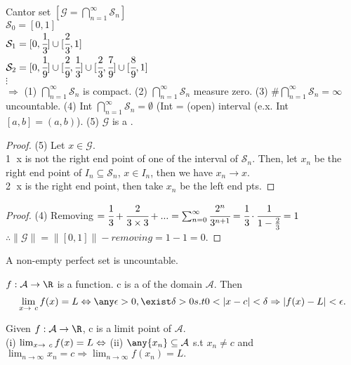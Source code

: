 \begin{definition}
\label{Cantor set}
    Cantor set $[ \mathcal{G} = \bigcap\limits_{n=1}^\infty \mathcal{S}_n]$ \\
    $\mathcal{S}_0 = [0,1]$\\
    $\mathcal{S}_1 = [0,\cfrac{1}{3}]\cup [\cfrac{2}{3},1]$\\
    $\mathcal{S}_2 = [0, \cfrac{1}{9}] \cup [\cfrac{2}{9}, \cfrac{1}{3}]\cup [\cfrac{2}{3}, \cfrac{7}{9}]\cup[\cfrac{8}{9}, 1]$\\
    $\vdots$ \\
    $\Rightarrow$ (1)  $\bigcap\limits_{n=1}^\infty \mathcal{S}_n$ is compact. (2) $\bigcap\limits_{n=1}^\infty \mathcal{S}_n$ measure zero. (3) $\#\bigcap\limits_{n=1}^\infty \mathcal{S}_n = \infty$ uncountable. (4) Int $\bigcap\limits_{n=1}^\infty \mathcal{S}_n = \emptyset$ (Int = (open) interval (e.x. Int $[a,b] =(a,b)$). %
    (5) $\mathcal{G}$ is a .
\end{definition}
\begin{proof}
    (5) Let $x \in \mathcal{G}.$ \\
    \textcircled{1} x is not the right end point of one of the interval of $\mathcal{S}_n$. Then, let $x_n$ be the right end point of $I_n \subseteq \mathcal{S}_n$, $x \in I_n$, then we have $x_n \rightarrow x$. \\
    \textcircled{2} x is the right end point, then take $x_n$ be the left end pts.
\end{proof}
\begin{proof}
    (4) Removing $=\cfrac{1}{3} + \cfrac{2}{3 \times 3} + ... = \sum_{n=0}^\infty \cfrac{2^n}{3^{n+1}} = \cfrac{1}{3} \cdot \cfrac{1}{1-\frac{2}{3}} = 1$
    $\therefore \|\mathcal{G}\| =\|[0,1]\| - removing = 1-1 =0$.
\end{proof}
\begin{theorem}
    A non-empty perfect set is uncountable.
\end{theorem}
\begin{definition}
    $f:\mathcal{A}\rightarrow \R$ is a function. c is a  of the domain $\mathcal{A}$. Then \[
    \lim_{x\to\ c} f(x) = L \Leftrightarrow \any \epsilon >0, \exist \delta >0 s.t 0<|x-c|<\delta \Rightarrow |f(x)-L| < \epsilon.
    \]
\end{definition}
\begin{theorem}
\label{Sequential Criterion for Functional Limits}
    Given $f:\mathcal{A}\rightarrow \R$, c is a limit point of $\mathcal{A}$.\\
    (i) $\lim_{x\to\ c} f(x) = L\\ \Leftrightarrow$ 
    (ii) $\any \{x_n\} \subseteq \mathcal{A}$ s.t $x_n \neq c$ and $\lim_{n\to\infty} x_n = c \Rightarrow \lim_{n\to\infty} f(x_n) = L.$
\end{theorem}
